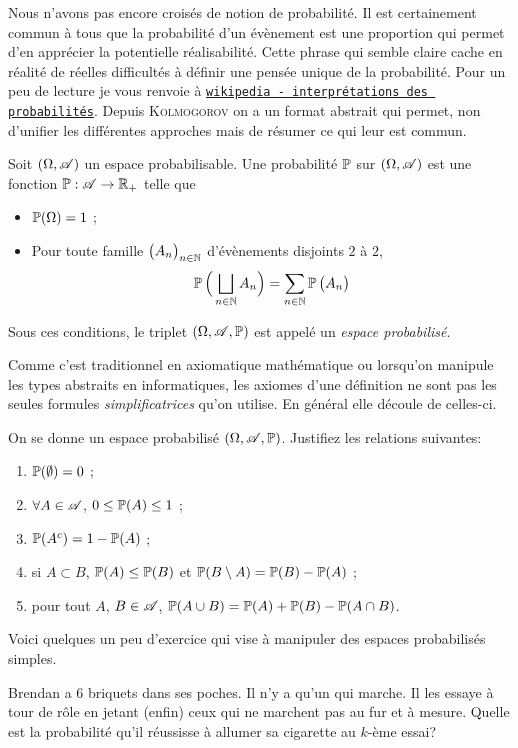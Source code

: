 \documentclass[11pt, a4paper]{article}
\begin{document}
Nous n'avons pas encore croisés de notion de probabilité. Il est
certainement commun à tous que la probabilité d'un évènement est une
proportion qui permet d'en apprécier la potentielle
réalisabilité. Cette phrase qui semble claire cache en réalité de
réelles difficultés à définir une pensée unique de la
probabilité. Pour un peu de lecture je vous renvoie à
\href{https://en.wikipedia.org/wiki/Probability\_interpretations}{\texttt{wikipedia
    - interprétations des probabilités}}.  Depuis \textsc{Kolmogorov}
on a un format abstrait qui permet, non d'unifier les différentes
approches mais de résumer ce qui leur est commun.
\begin{defn}
  Soit $(\Omega, \mathscr{A})$ un espace probabilisable. Une probabilité
  $\operatorname{\mathbb{P}}$ sur $(\Omega, \mathscr{A})$ est une fonction
  $\operatorname{\mathbb{P}} : \mathscr{A} \rightarrow \mathbb{R}_+$ telle que
  \begin{itemize}
  \item $\operatorname{\mathbb{P}}(\Omega) = 1$ ;
  \item Pour toute famille $\big(A_n\big)_{n\in \mathbb{N}}$ d'évènements
    disjoints $2$ à $2$,
    \[
      \operatorname{\mathbb{P}}\Big(\bigsqcup_{n \in \mathbb{N}} A_n\Big) = \sum_{n \in \mathbb{N}} \operatorname{\mathbb{P}}\big(A_n\big)
    \]
  \end{itemize}
  Sous ces conditions, le triplet $(\Omega, \mathscr{A}, \operatorname{\mathbb{P}})$ est appelé un
  \emph{espace probabilisé}.
\end{defn}
Comme c'est traditionnel en axiomatique mathématique ou lorsqu'on
manipule les types abstraits en informatiques, les axiomes d'une
définition ne sont pas les seules formules \textit{simplificatrices}
qu'on utilise. En général elle découle de celles-ci.
\begin{question}
  On se donne un espace probabilisé $(\Omega, \mathscr{A}, \operatorname{\mathbb{P}})$. Justifiez
  les relations suivantes:
  \begin{enumerate}
  \item $\operatorname{\mathbb{P}}(\emptyset) = 0$ ;
  \item $\forall A \in \mathscr{A}$, $0 \leq \operatorname{\mathbb{P}}(A) \leq 1$ ;
  \item $\operatorname{\mathbb{P}}(A^c) = 1 - \operatorname{\mathbb{P}}(A)$ ;
  \item si $A \subset B$, $\operatorname{\mathbb{P}}(A) \leq \operatorname{\mathbb{P}}(B)$ et
    $\operatorname{\mathbb{P}}(B \setminus A) = \operatorname{\mathbb{P}}(B) - \operatorname{\mathbb{P}}(A)$ ;
  \item pour tout $A$, $B \in \mathscr{A}$,
    $\operatorname{\mathbb{P}}(A\cup B) = \operatorname{\mathbb{P}}(A) + \operatorname{\mathbb{P}}(B) - \operatorname{\mathbb{P}}(A\cap B)$.
  \end{enumerate}
\end{question}
Voici quelques un peu d'exercice qui vise à manipuler des espaces
probabilisés simples.
\begin{question}
  Brendan a $6$ briquets dans ses poches. Il n'y a qu'un qui
  marche. Il les essaye à tour de rôle en jetant (enfin) ceux qui ne
  marchent pas au fur et à mesure. Quelle est la probabilité qu'il
  réussisse à allumer sa cigarette au $k$-ème essai?
\end{question}
\end{document}
